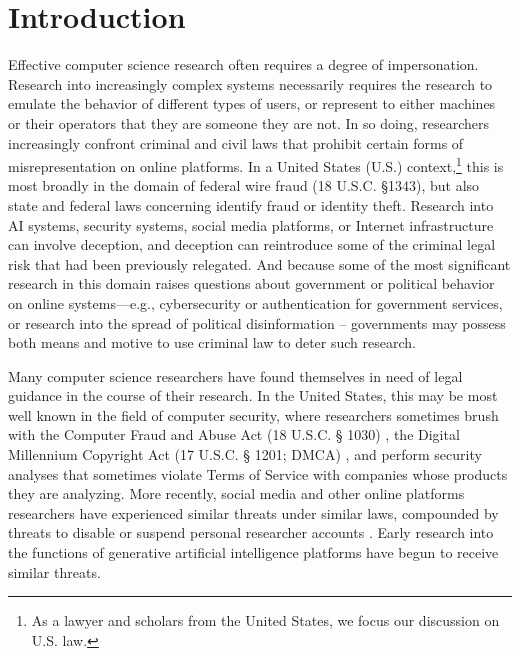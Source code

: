 
\section{Introduction}
\label{sec:introduction}

Effective computer science research often requires a degree of impersonation.  Research into increasingly complex systems necessarily requires the research to emulate the behavior of different types of users, or represent to either machines or their operators that they are someone they are not. In so doing, researchers increasingly confront criminal and civil laws that prohibit certain forms of misrepresentation on online platforms. In a United States (U.S.) context,\footnote{As a lawyer and scholars from the United States, we focus our discussion on U.S. law.} this is most broadly in the domain of federal wire fraud (18 U.S.C. §1343), but also state and federal laws concerning identify fraud or identity theft. Research into  AI systems, security systems, social media platforms, or Internet infrastructure can involve deception, and deception can reintroduce some of the criminal legal risk that had been previously relegated. And because some of the most significant research in this domain raises questions about government or political behavior on online systems---e.g., cybersecurity or authentication
for government services, or research into the spread of political disinformation -- governments may possess both means and motive to use criminal law to deter such research.

Many computer science researchers have found themselves in need of legal guidance in the course of their research.
In the United States, this may be most well known in the field of computer security, where researchers sometimes brush with the Computer Fraud and Abuse Act (18 U.S.C. § 1030)  \cite{parkResearchersGuideLegal, mulligan_cybersecurity_2015}, %
the Digital Millennium Copyright Act (17 U.S.C. § 1201; DMCA) \cite{simons_viewpoint_2001,noauthor_thawing_2021},
and perform security analyses that sometimes violate Terms of Service with companies whose products they are analyzing. More recently, social media and other online platforms researchers have experienced similar threats under similar laws, compounded by threats to disable or suspend personal researcher accounts \cite{edelsonUnderstandingEngagementUS2021, longpre_safe_2024}.
Early research into the functions of generative artificial intelligence platforms have begun to receive similar threats. \cite{kumarLegalRisksAdversarial, edwards2024}

